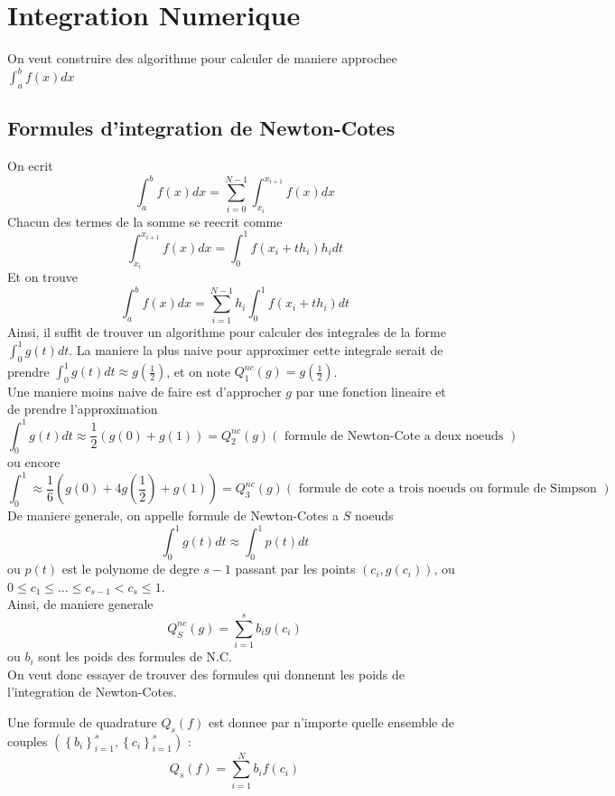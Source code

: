 \documentclass[../main.tex]{subfiles}
\begin{document}
\section{Integration Numerique}
On veut construire des algorithme pour calculer de maniere approchee $ \int_{ a }^{ b }f( x) dx$ 
\subsection{Formules d'integration de Newton-Cotes}
On ecrit
\[ 
\int_{ a }^{ b } f( x) dx = \sum_{i=0}^{ N-1}\int_{ x_i }^{ x_{i+1}  } f( x) dx
\]
Chacun des termes de la somme se reecrit comme
\[ 
\int_{ x_i }^{ x_{i+1}  } f( x) dx = \int_{ 0 }^{ 1 } f( x_i + th_i) h_i dt
\]
Et on trouve
\[ 
\int_{ a }^{ b }f( x) dx = \sum_{i=1}^{ N-1}h_i \int_{ 0 }^{ 1 } f( x_i + th_i) dt
\]
Ainsi, il suffit de trouver un algorithme pour calculer des integrales de la forme $ \int_{ 0 }^{ 1 }g( t) dt$.
La maniere la plus naive pour approximer cette integrale serait de prendre $ \int_{ 0 }^{ 1 } g( t) dt \approx g( \frac{1}{2}) $, et on note $Q_1^{nc}( g) = g( \frac{1}{2}) $.\\
Une maniere moins naive de faire est d'approcher $g$ par une fonction lineaire et de prendre l'approximation
\[ 
\int_{ 0 }^{ 1 }g( t) dt \approx \frac{1}{2} \left( g( 0) +g( 1) \right)= Q_2^{nc}( g) 	 ( \text{ formule de Newton-Cote a deux noeuds } ) 
\]
ou encore
\[ 
\int_{ 0 }^{ 1 } \approx \frac{1}{6}( g( 0) + 4 g( \frac{1}{2}) + g( 1) ) = Q_3^{nc}( g) ( \text{ formule de cote a trois noeuds ou formule de Simpson } ) 
\]
De maniere generale, on appelle formule de Newton-Cotes a $S$ noeuds
\[ 
\int_{ 0 }^{ 1 }g( t) dt \approx \int_{ 0 }^{ 1 }p( t) dt
\]
ou $p( t) $ est le polynome de degre $s-1$ passant par les points $ ( c_i, g( c_i) ) $, ou $ 0 \leq c_1 \leq \ldots \leq c_{s-1} < c_{s} \leq 1$.\\
Ainsi, de maniere generale
\[ 
Q_S^{nc}( g) = \sum_{i=1}^{ s} b_i g( c_i) 
\]
ou $b_i$ sont les poids des formules de N.C.\\
On veut donc essayer de trouver des formules qui donnennt les poids de l'integration de Newton-Cotes.
\begin{defn}
	Une formule de quadrature $Q_s( f) $ est donnee par n'importe quelle ensemble de couples $ ( \left\{ b_i \right\}_{i=1}^{s}, \left\{ c_i \right\}_{i=1}^{s}) $ :
	\[ 
	Q_s( f) = \sum_{i=1}^{ N}b_i f( c_i) 
	\]
	
\end{defn}
\end{document}
